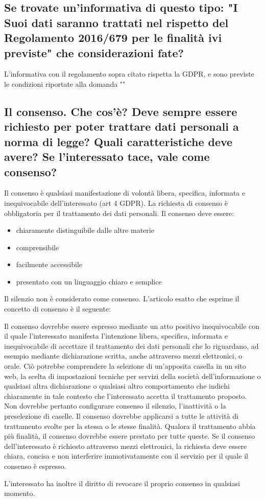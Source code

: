 \subsection{Se trovate un'informativa di questo tipo: "I Suoi dati saranno
trattati nel rispetto del Regolamento 2016/679 per le finalità ivi previste"
che considerazioni fate?}

L'informativa con il regolamento sopra citato rispetta la GDPR, e sono previste
le condizioni riportate alla domanda ""

\subsection{Il consenso. Che cos’è? Deve sempre essere richiesto per poter trattare dati personali a norma
di legge? Quali caratteristiche deve avere? Se l'interessato tace, vale come consenso?}

Il consenso è qualsiasi manifestazione di volontà libera, specifica, informata
e inequivocabile dell'interessato (art 4 GDPR).
\newline
La richiesta di consenso è obbligatoria per il trattamento dei dati personali.
Il consenso deve essere:
\begin{itemize}
    \item chiaramente distinguibile dalle altre materie
    \item comprensibile
    \item facilmente accessibile
    \item presentato con un linguaggio chiaro e semplice
\end{itemize}
Il silenzio non è considerato come consenso.
\newline
L'articolo esatto che esprime il concetto di consenso è il seguente:
\begin{mdframed}
    [backgroundcolor=blue!20]Il consenso dovrebbe essere espresso mediante un
    atto positivo inequivocabile con il quale l’interessato manifesta
    l’intenzione libera, specifica, informata e inequivocabile di accettare il
    trattamento dei dati personali che lo riguardano, ad esempio mediante
    dichiarazione scritta, anche attraverso mezzi elettronici, o orale. Ciò
    potrebbe comprendere la selezione di un’apposita casella in un sito web, la
    scelta di impostazioni tecniche per servizi della società dell’informazione
    o qualsiasi altra dichiarazione o qualsiasi altro comportamento che indichi
    chiaramente in tale contesto che l’interessato accetta il trattamento
    proposto. Non dovrebbe pertanto configurare consenso il silenzio,
    l’inattività o la preselezione di caselle. Il consenso dovrebbe applicarsi
    a tutte le attività di trattamento svolte per la stessa o le stesse
    finalità. Qualora il trattamento abbia più finalità, il consenso dovrebbe
    essere prestato per tutte queste. Se il consenso dell’interessato è
    richiesto attraverso mezzi elettronici, la richiesta deve essere chiara,
    concisa e non interferire immotivatamente con il servizio per il quale il
    consenso è espresso.
\end{mdframed}
L'interessato ha inoltre il diritto di revocare il proprio consenso in
qualsiasi momento.
